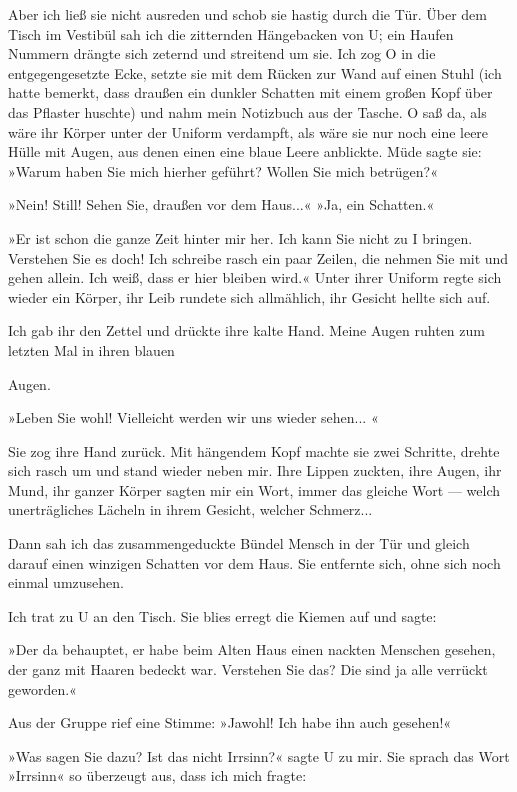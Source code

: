 Aber ich ließ sie nicht ausreden und schob sie hastig durch die
Tür. Über dem Tisch im Vestibül sah ich die zitternden Hängebacken
von U; ein Haufen Nummern drängte sich zeternd und streitend um
sie. Ich zog O in die entgegengesetzte Ecke, setzte sie mit dem
Rücken zur Wand auf einen Stuhl (ich hatte bemerkt, dass draußen
ein dunkler Schatten mit einem großen Kopf über das Pflaster
huschte) und nahm mein Notizbuch aus der Tasche. O saß da, als wäre
ihr Körper unter der Uniform verdampft, als wäre sie nur noch eine
leere Hülle mit Augen, aus denen einen eine blaue Leere anblickte.
Müde sagte sie: »Warum haben Sie mich hierher geführt? Wollen Sie
mich betrügen?«

»Nein! Still! Sehen Sie, draußen vor dem Haus...« »Ja, ein
Schatten.«

»Er ist schon die ganze Zeit hinter mir her. Ich kann Sie nicht zu
I bringen. Verstehen Sie es doch! Ich schreibe rasch ein paar
Zeilen, die nehmen Sie mit und gehen allein. Ich weiß, dass er hier
bleiben wird.« Unter ihrer Uniform regte sich wieder ein Körper,
ihr Leib rundete sich allmählich, ihr Gesicht hellte sich auf.

Ich gab ihr den Zettel und drückte ihre kalte Hand. Meine Augen
ruhten zum letzten Mal in ihren blauen

Augen.

»Leben Sie wohl! Vielleicht werden wir uns wieder sehen... «

Sie zog ihre Hand zurück. Mit hängendem Kopf machte sie zwei
Schritte, drehte sich rasch um und stand wieder neben mir. Ihre
Lippen zuckten, ihre Augen, ihr Mund, ihr ganzer Körper sagten mir
ein Wort, immer das gleiche Wort — welch unerträgliches Lächeln in
ihrem Gesicht, welcher Schmerz...

Dann sah ich das zusammengeduckte Bündel Mensch in der Tür und
gleich darauf einen winzigen Schatten vor dem Haus. Sie entfernte
sich, ohne sich noch einmal umzusehen.

Ich trat zu U an den Tisch. Sie blies erregt die Kiemen auf und
sagte:

»Der da behauptet, er habe beim Alten Haus einen nackten Menschen
gesehen, der ganz mit Haaren bedeckt war. Verstehen Sie das? Die
sind ja alle verrückt geworden.«

Aus der Gruppe rief eine Stimme: »Jawohl! Ich habe ihn auch
gesehen!«

»Was sagen Sie dazu? Ist das nicht Irrsinn?« sagte U zu mir. Sie
sprach das Wort »Irrsinn« so überzeugt aus, dass ich mich fragte:

